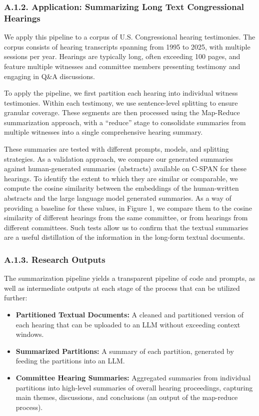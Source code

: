 \documentclass[11pt]{article}
\begin{document}
\subsubsection*{A.1.2. Application: Summarizing Long Text Congressional Hearings}

We apply this pipeline to a corpus of U.S. Congressional hearing testimonies. The corpus consists of hearing transcripts spanning from 1995 to 2025, with multiple sessions per year. Hearings are typically long, often exceeding 100 pages, and feature multiple witnesses and committee members presenting testimony and engaging in Q\&A discussions.

To apply the pipeline, we first partition each hearing into individual witness testimonies. Within each testimony, we use sentence-level splitting to ensure granular coverage. These segments are then processed using the Map-Reduce summarization approach, with a ``reduce'' stage to consolidate summaries from multiple witnesses into a single comprehensive hearing summary.

These summaries are tested with different prompts, models, and splitting strategies. As a validation approach, we compare our generated summaries against human-generated summaries (abstracts) available on C-SPAN for these hearings. To identify the extent to which they are similar or comparable, we compute the cosine similarity between the embeddings of the human-written abstracts and the large language model generated summaries. As a way of providing a baseline for these values, in Figure 1, we compare them to the cosine similarity of different hearings from the same committee, or from hearings from different committees. Such tests allow us to confirm that the textual summaries are a useful distillation of the information in the long-form textual documents.

\subsubsection*{A.1.3. Research Outputs}

The summarization pipeline yields a transparent pipeline of code and prompts, as well as intermediate outputs at each stage of the process that can be utilized further:

\begin{itemize}
    \item \textbf{Partitioned Textual Documents:} A cleaned and partitioned version of each hearing that can be uploaded to an LLM without exceeding context windows.
    \item \textbf{Summarized Partitions:} A summary of each partition, generated by feeding the partitions into an LLM.
    \item \textbf{Committee Hearing Summaries:} Aggregated summaries from individual partitions into high-level summaries of overall hearing proceedings, capturing main themes, discussions, and conclusions (an output of the map-reduce process).
\end{itemize}
\end{document}
